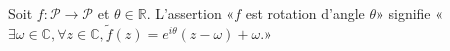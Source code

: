 Soit $f:\mathcal P\to \mathcal P$ et $\theta\in\mathbb R$. L'assertion «$f$ est rotation d'angle $\theta$» signifie «$\exists \omega\in\mathbb C, \forall z\in\mathbb C, \tilde f(z)=e^{i\theta}(z-\omega)+\omega$.»

\begin{reponses}
\end{reponses}

